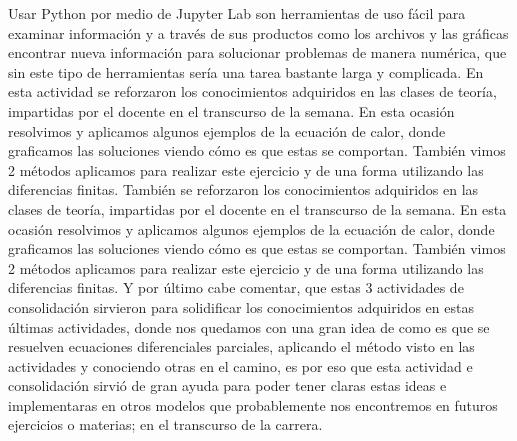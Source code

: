 \documentclass[12pt]{article}
\begin{document}
Usar Python por medio de Jupyter Lab son herramientas de uso fácil para examinar información y a través de sus productos como los archivos y las gráficas encontrar nueva información para solucionar problemas de manera numérica, que sin este tipo de herramientas sería una tarea bastante larga y complicada.
En esta actividad se reforzaron los conocimientos adquiridos en las clases de teoría, impartidas por el docente en el transcurso de la semana. En esta ocasión resolvimos y aplicamos algunos ejemplos de la ecuación de calor, donde graficamos las soluciones viendo cómo es que estas se comportan. También vimos 2 métodos aplicamos para realizar este ejercicio y de una forma utilizando las diferencias finitas.
También se reforzaron los conocimientos adquiridos en las clases de teoría, impartidas por el docente en el transcurso de la semana. En esta ocasión resolvimos y aplicamos algunos ejemplos de la ecuación de calor, donde graficamos las soluciones viendo cómo es que estas se comportan. También vimos 2 métodos aplicamos para realizar este ejercicio y de una forma utilizando las diferencias finitas.
Y por último cabe comentar, que estas 3 actividades de consolidación sirvieron para solidificar los conocimientos adquiridos en estas últimas actividades, donde nos quedamos con una gran idea de como es que se resuelven ecuaciones diferenciales parciales, aplicando el método visto en las actividades y conociendo otras en el camino, es por eso que esta actividad e consolidación sirvió de gran ayuda para poder tener claras estas ideas e implementaras en otros modelos que probablemente nos encontremos en futuros ejercicios o materias; en el transcurso de la carrera.


\end{document}

